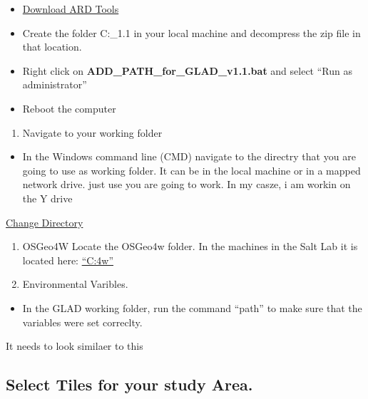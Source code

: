 \documentclass[]{article}
\providecommand{\tightlist}{%
  \setlength{\itemsep}{0pt}\setlength{\parskip}{0pt}}
\begin{document}
\begin{itemize}
\tightlist
\item
  \href{https://glad.umd.edu/Potapov/ARD/GLAD_1.1.zip}{Download ARD
  Tools}
\item
  Create the folder C:\GLAD\_1.1 in your local machine and decompress
  the zip file in that location.
\item
  Right click on \textbf{ADD\_PATH\_for\_GLAD\_v1.1.bat} and select
  ``Run as administrator''
\item
  Reboot the computer
\end{itemize}

\begin{enumerate}
\def\labelenumi{\arabic{enumi}.}
\setcounter{enumi}{3}
\tightlist
\item
  Navigate to your working folder
\end{enumerate}

\begin{itemize}
\tightlist
\item
  In the Windows command line (CMD) navigate to the directry that you
  are going to use as working folder. It can be in the local machine or
  in a mapped network drive. just use you are going to work. In my
  casze, i am workin on the Y drive
\end{itemize}

\href{}{Change Directory}

\begin{enumerate}
\def\labelenumi{\arabic{enumi}.}
\setcounter{enumi}{4}
\item
  OSGeo4W Locate the OSGeo4w folder. In the machines in the Salt Lab it
  is located here: \href{xx}{``C:\OSGeo4w''}
\item
  Environmental Varibles.
\end{enumerate}

\begin{itemize}
\tightlist
\item
  In the GLAD working folder, run the command ``path'' to make sure that
  the variables were set correclty.
\end{itemize}

It needs to look similaer to this

\hypertarget{select-tiles-for-your-study-area.}{%
\subsection{Select Tiles for your study
Area.}\label{select-tiles-for-your-study-area.}}
\end{document}
